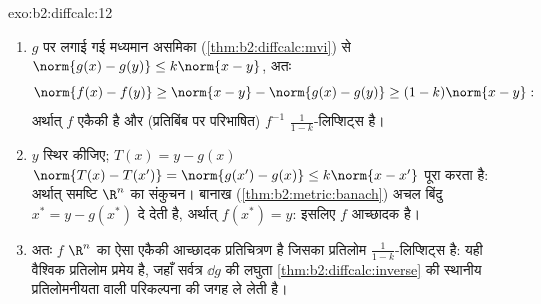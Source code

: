 \begin{solution}{exo:b2:diffcalc:12}
\begin{enumerate}
  \item $g$ पर लगाई गई मध्यमान असमिका (\cref{thm:b2:diffcalc:mvi}) से $\norm{g(x) - g(y)} \leq k\norm{x-y}$, अतः
        \[
        \norm{f(x) - f(y)} \geq \norm{x - y} - \norm{g(x) -
        g(y)} \geq (1 - k)\norm{x - y} :
        \]
        अर्थात् $f$ एकैकी है और (प्रतिबिंब पर परिभाषित) $f^{-1}$
        $\frac{1}{1-k}$-लिप्शिट्स है।
  \item $y$ स्थिर कीजिए; $T(x) = y - g(x)$ $\norm{T(x) -
        T(x')} = \norm{g(x') - g(x)} \leq k\norm{x - x'}$ पूरा करता है: अर्थात्  समष्टि $\R^n$
        का संकुचन। बानाख (\cref{thm:b2:metric:banach}) अचल बिंदु $x^*
        = y - g(x^*)$ दे देती है, अर्थात् $f(x^*) = y$:
        इसलिए $f$ आच्छादक है।
  \item अतः $f$ $\R^n$ का ऐसा एकैकी आच्छादक प्रतिचित्रण है जिसका प्रतिलोम
        $\frac{1}{1-k}$-लिप्शिट्स है: यही वैश्विक प्रतिलोम प्रमेय है, जहाँ सर्वत्र
        $\dd g$ की लघुता \cref{thm:b2:diffcalc:inverse} की स्थानीय प्रतिलोमनीयता वाली परिकल्पना की जगह
        ले लेती है।
\end{enumerate}
\end{solution}


